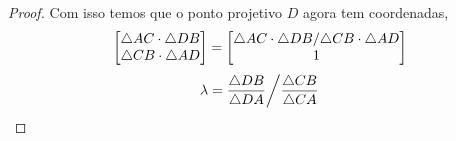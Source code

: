 \begin{proof}
Com isso temos que o ponto projetivo $D$ agora tem coordenadas,
\[ \begin{bmatrix} \triangle AC \cdot \triangle DB \\ \triangle CB \cdot \triangle AD \\  \end{bmatrix} = \begin{bmatrix} \triangle AC \cdot \triangle DB / \triangle CB \cdot \triangle AD \\ 1 \\  \end{bmatrix}\]
\[ \left. \lambda = \frac{\triangle DB}{\triangle DA} \middle/ \frac{\triangle CB}{\triangle CA}\right.\]
\end{proof}
